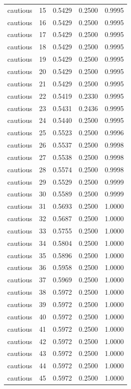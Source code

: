 \begin{tabular}{lrrrr}
cautious & 15 & 0.5429 & 0.2500 & 0.9995 \\
cautious & 16 & 0.5429 & 0.2500 & 0.9995 \\
cautious & 17 & 0.5429 & 0.2500 & 0.9995 \\
cautious & 18 & 0.5429 & 0.2500 & 0.9995 \\
cautious & 19 & 0.5429 & 0.2500 & 0.9995 \\
cautious & 20 & 0.5429 & 0.2500 & 0.9995 \\
cautious & 21 & 0.5429 & 0.2500 & 0.9995 \\
cautious & 22 & 0.5419 & 0.2330 & 0.9995 \\
cautious & 23 & 0.5431 & 0.2436 & 0.9995 \\
cautious & 24 & 0.5440 & 0.2500 & 0.9995 \\
cautious & 25 & 0.5523 & 0.2500 & 0.9996 \\
cautious & 26 & 0.5537 & 0.2500 & 0.9998 \\
cautious & 27 & 0.5538 & 0.2500 & 0.9998 \\
cautious & 28 & 0.5574 & 0.2500 & 0.9998 \\
cautious & 29 & 0.5529 & 0.2500 & 0.9999 \\
cautious & 30 & 0.5589 & 0.2500 & 0.9999 \\
cautious & 31 & 0.5693 & 0.2500 & 1.0000 \\
cautious & 32 & 0.5687 & 0.2500 & 1.0000 \\
cautious & 33 & 0.5755 & 0.2500 & 1.0000 \\
cautious & 34 & 0.5804 & 0.2500 & 1.0000 \\
cautious & 35 & 0.5896 & 0.2500 & 1.0000 \\
cautious & 36 & 0.5958 & 0.2500 & 1.0000 \\
cautious & 37 & 0.5969 & 0.2500 & 1.0000 \\
cautious & 38 & 0.5972 & 0.2500 & 1.0000 \\
cautious & 39 & 0.5972 & 0.2500 & 1.0000 \\
cautious & 40 & 0.5972 & 0.2500 & 1.0000 \\
cautious & 41 & 0.5972 & 0.2500 & 1.0000 \\
cautious & 42 & 0.5972 & 0.2500 & 1.0000 \\
cautious & 43 & 0.5972 & 0.2500 & 1.0000 \\
cautious & 44 & 0.5972 & 0.2500 & 1.0000 \\
cautious & 45 & 0.5972 & 0.2500 & 1.0000 \\

\end{tabular}
